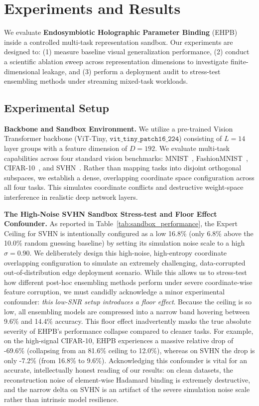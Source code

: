 \section{Experiments and Results}
\label{sec:experiments}

We evaluate \textbf{Endosymbiotic Holographic Parameter Binding} (EHPB) inside a controlled multi-task representation sandbox. Our experiments are designed to: (1) measure baseline visual generalization performance, (2) conduct a scientific ablation sweep across representation dimensions to investigate finite-dimensional leakage, and (3) perform a deployment audit to stress-test ensembling methods under streaming mixed-task workloads.

\subsection{Experimental Setup}

\textbf{Backbone and Sandbox Environment.} We utilize a pre-trained Vision Transformer backbone (ViT-Tiny, $\mathtt{vit\_tiny\_patch16\_224}$) consisting of $L=14$ layer groups with a feature dimension of $D=192$. We evaluate multi-task capabilities across four standard vision benchmarks: MNIST~\cite{lecun1998gradient}, FashionMNIST~\cite{xiao2017fashion}, CIFAR-10~\cite{krizhevsky2009learning}, and SVHN~\cite{netzer2011reading}. Rather than mapping tasks into disjoint orthogonal subspaces, we establish a dense, overlapping coordinate space configuration across all four tasks. This simulates coordinate conflicts and destructive weight-space interference in realistic deep network layers.

\textbf{The High-Noise SVHN Sandbox Stress-test and Floor Effect Confounder.} As reported in Table~\ref{tab:sandbox_performance}, the Expert Ceiling for SVHN is intentionally configured as a low 16.8\% (only 6.8\% above the 10.0\% random guessing baseline) by setting its simulation noise scale to a high $\sigma = 0.90$. We deliberately design this high-noise, high-entropy coordinate overlapping configuration to simulate an extremely challenging, data-corrupted out-of-distribution edge deployment scenario. While this allows us to stress-test how different post-hoc ensembling methods perform under severe coordinate-wise feature corruption, we must candidly acknowledge a minor experimental confounder: \textit{this low-SNR setup introduces a floor effect}. Because the ceiling is so low, all ensembling models are compressed into a narrow band hovering between 9.6\% and 14.4\% accuracy. This floor effect inadvertently masks the true absolute severity of EHPB's performance collapse compared to cleaner tasks. For example, on the high-signal CIFAR-10, EHPB experiences a massive relative drop of -69.6\% (collapsing from an 81.6\% ceiling to 12.0\%), whereas on SVHN the drop is only -7.2\% (from 16.8\% to 9.6\%). Acknowledging this confounder is vital for an accurate, intellectually honest reading of our results: on clean datasets, the reconstruction noise of element-wise Hadamard binding is extremely destructive, and the narrow delta on SVHN is an artifact of the severe simulation noise scale rather than intrinsic model resilience.

